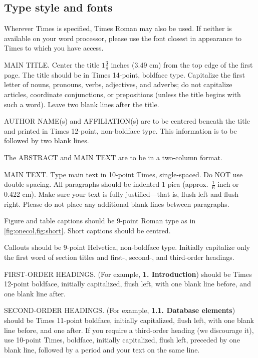 \subsection{Type style and fonts}

Wherever Times is specified, Times Roman may also be used.
If neither is available on your word processor, please use the font closest in
appearance to Times to which you have access.

MAIN TITLE.
Center the title $1\frac{3}{8}$ inches (3.49 cm) from the top edge of the first page.
The title should be in Times 14-point, boldface type.
Capitalize the first letter of nouns, pronouns, verbs, adjectives, and adverbs;
do not capitalize articles, coordinate conjunctions, or prepositions (unless the title begins with such a word).
Leave two blank lines after the title.

AUTHOR NAME(s) and AFFILIATION(s) are to be centered beneath the title
and printed in Times 12-point, non-boldface type.
This information is to be followed by two blank lines.

The ABSTRACT and MAIN TEXT are to be in a two-column format.

MAIN TEXT.
Type main text in 10-point Times, single-spaced.
Do NOT use double-spacing.
All paragraphs should be indented 1 pica (approx.~$\frac{1}{6}$ inch or 0.422 cm).
Make sure your text is fully justified---that is, flush left and flush right.
Please do not place any additional blank lines between paragraphs.

Figure and table captions should be 9-point Roman type as in \cref{fig:onecol,fig:short}.
Short captions should be centred.

\noindent Callouts should be 9-point Helvetica, non-boldface type.
Initially capitalize only the first word of section titles and first-, second-, and third-order headings.

FIRST-ORDER HEADINGS.
(For example, {\large \bf 1. Introduction}) should be Times 12-point boldface, initially capitalized, flush left, with one blank line before, and one blank line after.

SECOND-ORDER HEADINGS.
(For example, { \bf 1.1. Database elements}) should be Times 11-point boldface, initially capitalized, flush left, with one blank line before, and one after.
If you require a third-order heading (we discourage it), use 10-point Times, boldface, initially capitalized, flush left, preceded by one blank line, followed by a period and your text on the same line.

